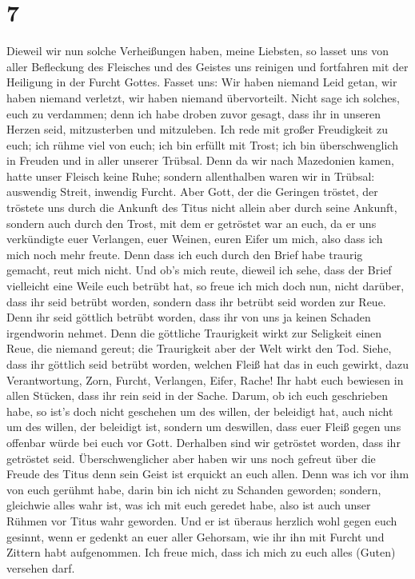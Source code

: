 \hypertarget{section-6}{%
\section{7}\label{section-6}}

 Dieweil wir nun solche Verheißungen haben, meine
Liebsten, so lasset uns von aller Befleckung des Fleisches und des
Geistes uns reinigen und fortfahren mit der Heiligung in der Furcht
Gottes.  Fasset uns: Wir haben niemand Leid getan, wir
haben niemand verletzt, wir haben niemand übervorteilt. 
Nicht sage ich solches, euch zu verdammen; denn ich habe droben zuvor
gesagt, dass ihr in unseren Herzen seid, mitzusterben und mitzuleben.
 Ich rede mit großer Freudigkeit zu euch; ich rühme viel
von euch; ich bin erfüllt mit Trost; ich bin überschwenglich in Freuden
und in aller unserer Trübsal.  Denn da wir nach Mazedonien
kamen, hatte unser Fleisch keine Ruhe; sondern allenthalben waren wir in
Trübsal: auswendig Streit, inwendig Furcht.  Aber Gott,
der die Geringen tröstet, der tröstete uns durch die Ankunft des Titus
 nicht allein aber durch seine Ankunft, sondern auch durch
den Trost, mit dem er getröstet war an euch, da er uns verkündigte euer
Verlangen, euer Weinen, euren Eifer um mich, also dass ich mich noch
mehr freute.  Denn dass ich euch durch den Brief habe
traurig gemacht, reut mich nicht. Und ob's mich reute, dieweil ich sehe,
dass der Brief vielleicht eine Weile euch betrübt hat,  so
freue ich mich doch nun, nicht darüber, dass ihr seid betrübt worden,
sondern dass ihr betrübt seid worden zur Reue. Denn ihr seid göttlich
betrübt worden, dass ihr von uns ja keinen Schaden irgendworin nehmet.
 Denn die göttliche Traurigkeit wirkt zur Seligkeit einen
Reue, die niemand gereut; die Traurigkeit aber der Welt wirkt den Tod.
 Siehe, dass ihr göttlich seid betrübt worden, welchen
Fleiß hat das in euch gewirkt, dazu Verantwortung, Zorn, Furcht,
Verlangen, Eifer, Rache! Ihr habt euch bewiesen in allen Stücken, dass
ihr rein seid in der Sache.  Darum, ob ich euch
geschrieben habe, so ist's doch nicht geschehen um des willen, der
beleidigt hat, auch nicht um des willen, der beleidigt ist, sondern um
deswillen, dass euer Fleiß gegen uns offenbar würde bei euch vor Gott.
 Derhalben sind wir getröstet worden, dass ihr getröstet
seid. Überschwenglicher aber haben wir uns noch gefreut über die Freude
des Titus denn sein Geist ist erquickt an euch allen. 
Denn was ich vor ihm von euch gerühmt habe, darin bin ich nicht zu
Schanden geworden; sondern, gleichwie alles wahr ist, was ich mit euch
geredet habe, also ist auch unser Rühmen vor Titus wahr geworden.
 Und er ist überaus herzlich wohl gegen euch gesinnt,
wenn er gedenkt an euer aller Gehorsam, wie ihr ihn mit Furcht und
Zittern habt aufgenommen.  Ich freue mich, dass ich mich
zu euch alles (Guten) versehen darf.

